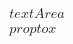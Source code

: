 \documentclass[preview]{standalone}
\begin{document}
\begin{align*}
\quad\\text{Area} \quad\\propto x
\end{align*}
\end{document}
